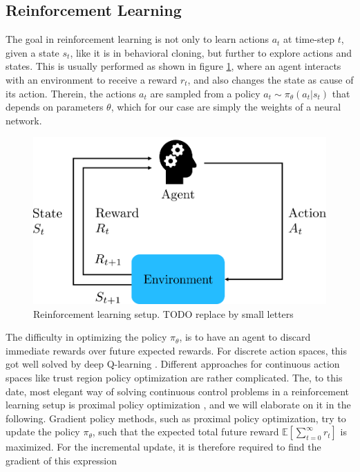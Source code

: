\subsection{Reinforcement Learning}
\label{sec::323_rl}
The goal in reinforcement learning is not only to learn actions $a_t$ at time-step $t$, given a state $s_t$, like it is in behavioral cloning, but further to explore actions and states. This is usually performed as shown in figure \ref{fig::323_rl}, where an agent interacts with an environment to receive a reward $r_t$, and also changes the state as cause of its action. Therein, the actions $a_t$ are sampled from a policy $a_t\sim\pi_\theta(a_t|s_t)$ that depends on parameters $\theta$, which for our case are simply the weights of a neural network. 
\begin{figure}[h]
	\centering
	\includegraphics[scale=.5]{chapters/03_background/img/reinforcement_learning.png}
	\caption{Reinforcement learning setup. TODO replace by small letters}
	\label{fig::323_rl}
\end{figure}
The difficulty in optimizing the policy $\pi_\theta$, is to have an agent to discard immediate rewards over future expected rewards. For discrete action spaces, this got well solved by deep Q-learning \cite{mnih2015human}. Different approaches for continuous action spaces like trust region policy optimization \cite{schulman2015trust} are rather complicated. The, to this date, most elegant way of solving continuous control problems in a reinforcement learning setup is proximal policy optimization \cite{schulman2017proximal}, and we will elaborate on it in the following. Gradient policy methods, such as proximal policy optimization, try to update the policy $\pi_\theta$, such that the expected total future reward $\mathbb{E}\left[\sum_{t=0}^\infty r_t\right]$ is maximized. For the incremental update, it is therefore required to find the gradient of this expression
